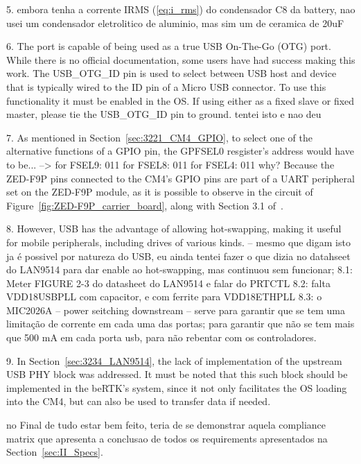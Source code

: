 5. embora tenha a corrente IRMS (\ref{eq:i_rms}) do condensador C8 da battery, nao usei um condensador eletrolitico de aluminio, mas sim um de ceramica de 20uF

6. The port is capable of being used as a true USB On-The-Go (OTG) port. While there is no official documentation, some users have had success making this work. The USB\_OTG\_ID pin is used to select between USB host and device that is typically wired to the ID pin of a Micro USB connector. To use this functionality it must be enabled in the OS. If using either as a fixed slave or fixed master, please tie the USB\_OTG\_ID pin to ground. tentei isto e nao deu

7. As mentioned in Section~\ref{sec:3221_CM4_GPIO}, to select one of the alternative functions of a GPIO pin, the GPFSEL0 resgister's address would have to be... -->
    for FSEL9: 011
    for FSEL8: 011
    for FSEL4: 011
why? Because the ZED-F9P pins connected to the CM4's GPIO pins are part of a UART peripheral set on the ZED-F9P module, as it is possible to observe in the circuit of Figure~\ref{fig:ZED-F9P_carrier_board}, along with Section 3.1 of~\cite{ZED_F9P}.

8. %
However, USB has the advantage of allowing hot-swapping, making it useful for mobile peripherals, including drives of various kinds. -- mesmo que digam isto ja é possivel por natureza do USB, eu ainda tentei fazer o que dizia no datahseet do LAN9514 para dar enable ao hot-swapping, mas continuou sem funcionar;
8.1: Meter FIGURE 2-3 do datasheet do LAN9514 e falar do PRTCTL
8.2: falta VDD18USBPLL com capacitor, e com ferrite para VDD18ETHPLL
8.3: o MIC2026A -- power seitching downstream -- serve para garantir que se tem uma limitação de corrente em cada uma das portas; para garantir que não se tem mais que 500 mA em cada porta usb, para não rebentar com os controladores.

9. %
In Section~\ref{sec:3234_LAN9514}, the lack of implementation of the upstream USB PHY block was addressed. It must be noted that this such block should be implemented in the beRTK\textsuperscript{\textregistered}'s system, since it not only facilitates the OS loading into the CM4, but can also be used to transfer data if needed.

no Final de tudo estar bem feito, teria de se demonstrar aquela compliance matrix que apresenta a conclusao de todos os requirements apresentados na Section~\ref{sec:II_Specs}.